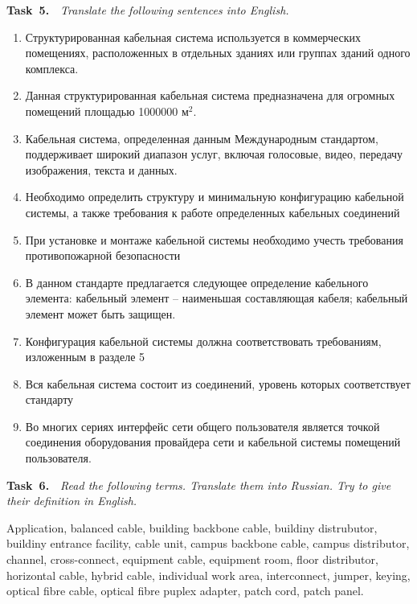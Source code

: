 {\bf Task~5.}~~{\it Translate the following sentences into English.}\par
\begin{enumerate}
    \item {Структурированная кабельная система используется в коммерческих помещениях,
    расположенных в отдельных зданиях или группах зданий одного комплекса.}
    \item {Данная структурированная кабельная система предназначена для огромных помещений площадью 1000000 м$^2$.}
    \item {Кабельная система, определенная данным Международным стандартом, поддерживает
    широкий диапазон услуг, включая голосовые, видео, передачу изображения, текста и данных.}
    \item {Необходимо определить структуру и минимальную конфигурацию кабельной системы, а
    также требования к работе определенных кабельных соединений}
    \item {При установке и монтаже кабельной системы необходимо учесть требования 
    противопожарной безопасности}
    \item {В данном стандарте предлагается следующее определение кабельного элемента:
    кабельный элемент -- наименьшая составляющая кабеля; кабельный элемент может быть защищен.}
    \item {Конфигурация кабельной системы должна соответствовать требованиям, изложенным в
    разделе 5}
    \item {Вся кабельная система состоит из соединений, уровень которых соответствует стандарту}
    \item {Во многих сериях интерфейс сети общего пользователя является точкой соединения
    оборудования провайдера сети и кабельной системы помещений пользователя.}
\end{enumerate}

{\bf Task~6.}~~{\it Read the following terms. Translate them into Russian. Try to give their definition in
English.}\par
Application, balanced cable, building backbone cable, buildiny distrubutor, buildiny entrance
facility, cable unit, campus backbone cable, campus distributor, channel, cross-connect, equipment cable,
equipment room, floor distributor, horizontal cable, hybrid cable, individual work area,
interconnect, jumper, keying, optical fibre cable, optical fibre puplex adapter, patch cord, patch panel.\par


